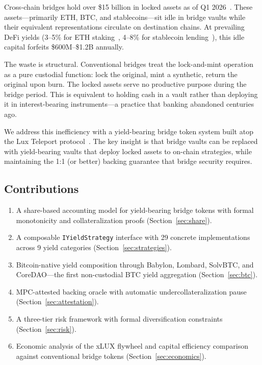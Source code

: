 \documentclass[11pt,twocolumn]{article}
\begin{document}
Cross-chain bridges hold over \$15 billion in locked assets as of Q1 2026~\cite{defillama2026}. These assets---primarily ETH, BTC, and stablecoins---sit idle in bridge vaults while their equivalent representations circulate on destination chains. At prevailing DeFi yields (3--5\% for ETH staking~\cite{lidofinance}, 4--8\% for stablecoin lending~\cite{aavev3}), this idle capital forfeits \$600M--\$1.2B annually.

The waste is structural. Conventional bridges treat the lock-and-mint operation as a pure custodial function: lock the original, mint a synthetic, return the original upon burn. The locked assets serve no productive purpose during the bridge period. This is equivalent to holding cash in a vault rather than deploying it in interest-bearing instruments---a practice that banking abandoned centuries ago.

We address this inefficiency with a yield-bearing bridge token system built atop the Lux Teleport protocol~\cite{luxteleport}. The key insight is that bridge vaults can be replaced with yield-bearing vaults that deploy locked assets to on-chain strategies, while maintaining the 1:1 (or better) backing guarantee that bridge security requires.

\subsection{Contributions}

\begin{enumerate}[nosep,leftmargin=1.5em]
  \item A share-based accounting model for yield-bearing bridge tokens with formal monotonicity and collateralization proofs (Section~\ref{sec:share}).
  \item A composable \texttt{IYieldStrategy} interface with 29 concrete implementations across 9 yield categories (Section~\ref{sec:strategies}).
  \item Bitcoin-native yield composition through Babylon, Lombard, SolvBTC, and CoreDAO---the first non-custodial BTC yield aggregation (Section~\ref{sec:btc}).
  \item MPC-attested backing oracle with automatic undercollateralization pause (Section~\ref{sec:attestation}).
  \item A three-tier risk framework with formal diversification constraints (Section~\ref{sec:risk}).
  \item Economic analysis of the xLUX flywheel and capital efficiency comparison against conventional bridge tokens (Section~\ref{sec:economics}).
\end{enumerate}
\end{document}
